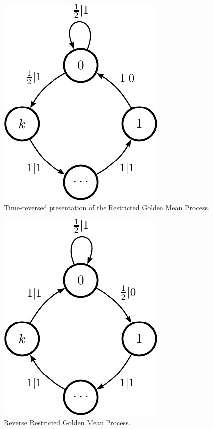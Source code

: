 \begin{figure}[th]
\begin{center}
\includegraphics{../chapter4/figures/restrictedgm_TRfeM_ur}
\caption{Time-reversed presentation of the Restricted Golden Mean Process.}
\label{fig:TRRestrictedGM}
\end{center}
\end{figure}

\begin{figure}[th]
\begin{center}
\includegraphics{../chapter4/figures/restrictedgm_reM_ur}
\caption{Reverse Restricted Golden Mean Process.}
\label{fig:ReverseRestrictedGM}
\end{center}
\end{figure}

